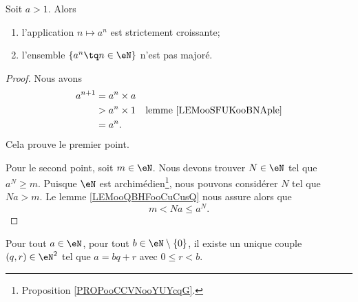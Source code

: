 \begin{proposition}	\label{PROPooSuiteGeometriqueCroissante}
	Soit \( a>1\). Alors
	\begin{enumerate}
		\item
		      l'application \( n\mapsto a^n\) est strictement croissante;
		\item
		      l'ensemble \( \{ a^n\tq n\in \eN \}\) n'est pas majoré.
	\end{enumerate}
\end{proposition}

\begin{proof}
	Nous avons
	\begin{subequations}
		\begin{align}
			a^{n+1} & =a^n\times a                                        \\
			        & >a^n\times 1 & \text{lemme \ref{LEMooSFUKooBNAple}} \\
			        & =a^n.
		\end{align}
	\end{subequations}
	Cela prouve le premier point.

	Pour le second point, soit \( m\in \eN\). Nous devons trouver \( N\in \eN\) tel que \( a^N\geq m\). Puisque \( \eN\) est archimédien\footnote{Proposition \ref{PROPooCCVNooYUYcqG}.}, nous pouvons considérer \( N\) tel que \( Na>m\). Le lemme \ref{LEMooQBHFooCuCusQ} nous assure alors que
	\begin{equation}
		m<Na\leq a^N.
	\end{equation}
\end{proof}

\begin{theorem}       \label{THOooKDJVooRIJRHP}
	Pour tout \( a\in \eN\), pour tout \( b\in \eN\setminus\{ 0 \}\), il existe un unique couple \( (q,r)\in \eN^2\) tel que \( a=bq+r\) avec \( 0\leq r<b\).
\end{theorem}

